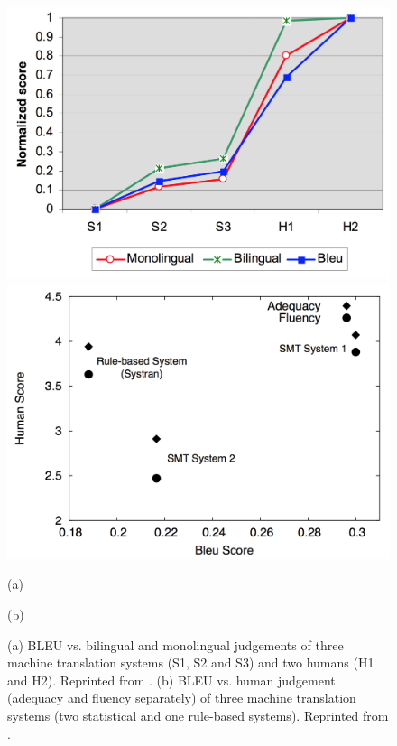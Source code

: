 \documentclass{report}
\begin{document}
\begin{figure}[ht]
    \centering
    \begin{minipage}{0.48\textwidth}
        \centering
        \includegraphics[width=0.99\columnwidth]{figures/bleu.png}
    \end{minipage}
    \hfill
    \begin{minipage}{0.48\textwidth}
        \centering
        \includegraphics[width=0.99\columnwidth]{figures/bleu_fail.png}
    \end{minipage}

    \begin{minipage}{0.48\textwidth}
        \centering
        (a)
    \end{minipage}
    \hfill
    \begin{minipage}{0.48\textwidth}
        \centering
        (b)
    \end{minipage}
    \caption{(a) BLEU vs. bilingual and monolingual judgements of three machine
    translation systems (S1, S2 and S3) and two humans (H1 and H2). Reprinted
from \cite{papineni2002bleu}. (b) BLEU vs. human judgement (adequacy and fluency
separately) of three machine translation systems (two statistical and one
rule-based systems). Reprinted from \cite{callison2006re}.}
    \label{fig:bleu}
\end{figure}
\end{document}
